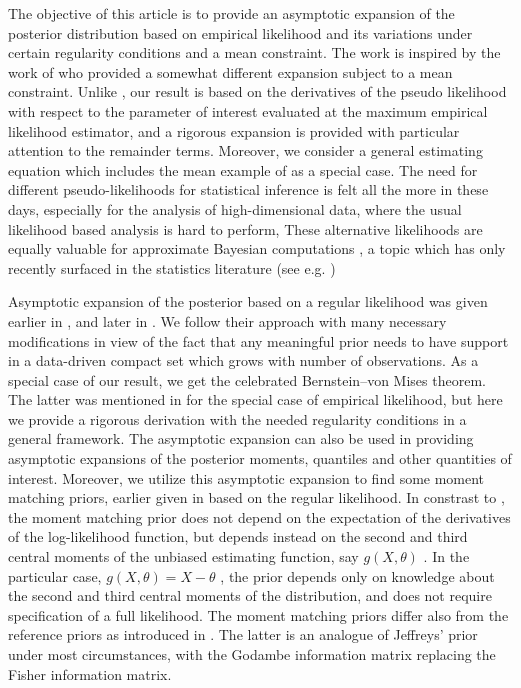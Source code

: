 \documentclass[oneside,english]{amsbook}
\numberwithin{section}{chapter}
\numberwithin{equation}{section}
\numberwithin{figure}{section}
\theoremstyle{plain}
\theoremstyle{plain}
\theoremstyle{definition}
\theoremstyle{plain}
\theoremstyle{plain}
\theoremstyle{remark}
\theoremstyle{definition}
\theoremstyle{definition}
\begin{document}
The objective of this article is to provide an asymptotic expansion
of the posterior distribution based on empirical likelihood and its
variations under certain regularity conditions and a mean constraint.
The work is inspired by the work of \cite{fang2006empirical}%
{} who provided a somewhat different expansion subject to a mean constraint.
Unlike \cite{fang2005expected,fang2006empirical}, our result is
based on the derivatives of the pseudo likelihood with respect to
the parameter of interest evaluated at the maximum empirical likelihood estimator,
and a rigorous expansion is provided with particular attention  to the remainder terms. Moreover, we consider a general estimating
equation which includes the mean example of \cite{fang2006empirical}
as a special case. The need for different pseudo-likelihoods for statistical
inference is felt all the more in these days, especially for the analysis
of high-dimensional data, where the usual likelihood based analysis
is hard to perform, These alternative likelihoods are equally valuable
for approximate Bayesian computations , a topic which has only recently
surfaced in the statistics literature (see e.g. \cite{cornuet2008inferring} )%

Asymptotic expansion of the posterior based on a regular likelihood
was given earlier in \cite{johnson1970asymptotic}, and later in
\cite{ghosh1982expansions}. We follow their approach with many necessary
modifications in view of the fact that any meaningful prior needs
to have support in   a data-driven compact set which grows with number of observations. As a special
case of our result, we get the celebrated Bernstein--von Mises theorem.
The latter was mentioned in \cite{lazar2003bayesian} %
for the special case of empirical likelihood, but here we provide
a rigorous  derivation with the needed regularity conditions in a general framework. The asymptotic expansion can also be used in providing asymptotic expansions of the posterior moments, quantiles and other quantities of interest. Moreover, we utilize this asymptotic expansion to find some moment matching priors, earlier given in \cite{ghosh2011moment} based on the regular likelihood.
In constrast to \cite{ghosh2011moment}, the moment matching prior does not depend on the expectation of the derivatives of the log-likelihood function, but depends instead on the second and third central moments of the unbiased estimating function, say $g\left(X,\theta\right)$ . In the particular case, $g\left(X,\theta\right)=X-\theta$ , the prior depends only on knowledge about the second and third central moments of the distribution, and does not require specification of a full likelihood. The moment matching priors differ also  from the reference priors as  introduced in \cite{clarke2010reference}. The latter is an analogue of Jeffreys' prior under most circumstances, with the Godambe information matrix \citep{godambe1960optimum} replacing the Fisher information matrix.
\end{document}
